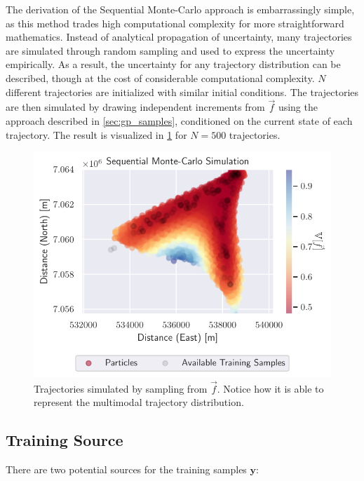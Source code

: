 The derivation of the Sequential Monte-Carlo approach is embarrassingly simple, as this method trades high computational complexity for more straightforward mathematics. Instead of analytical propagation of uncertainty, many trajectories are simulated through random sampling and used to express the uncertainty empirically. As a result, the uncertainty for any trajectory distribution can be described, though at the cost of considerable computational complexity.
$N$ different trajectories are initialized with similar initial conditions. The trajectories are then simulated by drawing independent increments from $\vec{f}$ using the approach described in \cref{sec:gp_samples}, conditioned on the current state of each trajectory. The result is visualized in \cref{fig:gp_particle} for $N=500$ trajectories.
\begin{figure}[h]
    \centering
    \includegraphics[width=\textwidth]{figures/dyngp/gp_particle.pdf}
    \caption{Trajectories simulated by sampling from $\vec{f}$. Notice how it is able to represent the multimodal trajectory distribution. }
    \label{fig:gp_particle}
\end{figure}

\subsection{Training Source}
There are two potential sources for the training samples $\boldsymbol{y}$:


